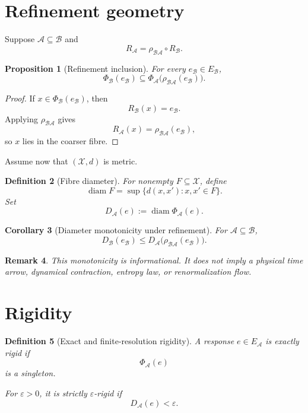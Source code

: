 \documentclass[11pt]{article}
\newtheorem{definition}{Definition}[section]
\newtheorem{proposition}[definition]{Proposition}
\newtheorem{corollary}[definition]{Corollary}
\newtheorem{remark}[definition]{Remark}
\newcommand{\X}{\mathcal X}
\newcommand{\Acal}{\mathcal A}
\newcommand{\Bcal}{\mathcal B}
\begin{document}
\section{Refinement geometry}

Suppose \(\Acal\subseteq\Bcal\) and
\[
R_{\Acal}
=
\rho_{\Bcal\Acal}\circ R_{\Bcal}.
\]

\begin{proposition}[Refinement inclusion]
For every \(e_{\Bcal}\in E_{\Bcal}\),
\[
\Phi_{\Bcal}(e_{\Bcal})
\subseteq
\Phi_{\Acal}\bigl(\rho_{\Bcal\Acal}(e_{\Bcal})\bigr).
\]
\end{proposition}

\begin{proof}
If \(x\in\Phi_{\Bcal}(e_{\Bcal})\), then
\[
R_{\Bcal}(x)=e_{\Bcal}.
\]
Applying \(\rho_{\Bcal\Acal}\) gives
\[
R_{\Acal}(x)=\rho_{\Bcal\Acal}(e_{\Bcal}),
\]
so \(x\) lies in the coarser fibre.
\end{proof}

Assume now that \((\X,d)\) is metric.

\begin{definition}[Fibre diameter]
For nonempty \(F\subseteq\X\), define
\[
\operatorname{diam}F
=
\sup\{d(x,x'):x,x'\in F\}.
\]
Set
\[
D_{\Acal}(e)
:=
\operatorname{diam}\Phi_{\Acal}(e).
\]
\end{definition}

\begin{corollary}[Diameter monotonicity under refinement]
For \(\Acal\subseteq\Bcal\),
\[
D_{\Bcal}(e_{\Bcal})
\le
D_{\Acal}\bigl(\rho_{\Bcal\Acal}(e_{\Bcal})\bigr).
\]
\end{corollary}

\begin{remark}
This monotonicity is informational. It does not imply a physical time arrow,
dynamical contraction, entropy law, or renormalization flow.
\end{remark}

\section{Rigidity}

\begin{definition}[Exact and finite-resolution rigidity]
A response \(e\in E_{\Acal}\) is exactly rigid if
\[
\Phi_{\Acal}(e)
\]
is a singleton.

For \(\varepsilon>0\), it is strictly \(\varepsilon\)-rigid if
\[
D_{\Acal}(e)<\varepsilon.
\]
\end{definition}
\end{document}
